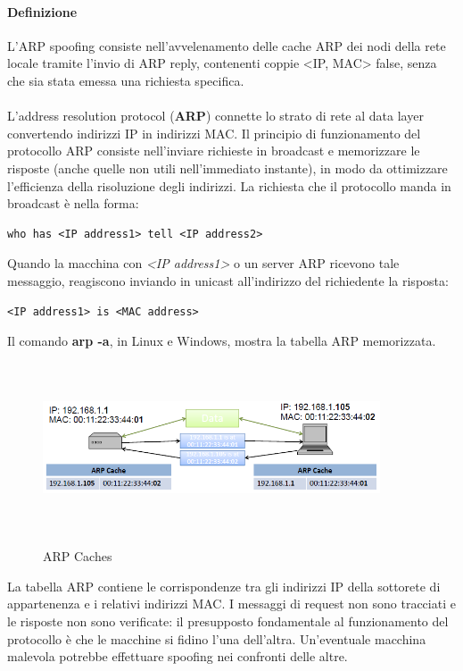 \paragraph{Definizione}
L'ARP spoofing consiste nell'avvelenamento delle cache ARP dei nodi della rete locale tramite l'invio di ARP reply, contenenti coppie <IP, MAC> false, senza che sia stata emessa una richiesta specifica. \\ \\
L'address resolution protocol (\textbf{ARP}) connette lo strato di rete al data layer convertendo indirizzi IP in indirizzi MAC. Il principio di funzionamento del protocollo ARP consiste nell'inviare richieste in broadcast e memorizzare le risposte (anche quelle non utili nell'immediato instante), in modo da ottimizzare l'efficienza della risoluzione degli indirizzi. La richiesta che il protocollo manda in broadcast è nella forma: 
\begin{lstlisting}
who has <IP address1> tell <IP address2>
\end{lstlisting}
Quando la macchina con \textit{<IP address1>} o un server ARP ricevono tale messaggio, reagiscono inviando in unicast all'indirizzo del richiedente la risposta:
\begin{lstlisting}
<IP address1> is <MAC address>
\end{lstlisting}
Il comando \textbf{arp -a}, in Linux e Windows, mostra la tabella ARP memorizzata. 
\begin{figure}[htbp]
	\centering%
	\subfigure%
	{\includegraphics[height=5cm, width=10cm, keepaspectratio]{Immagini/reti/ARP_Caches.png}}
	\caption{ARP Caches\label{fig:ARP_Caches}} 	
\end{figure}
La tabella ARP contiene le corrispondenze tra gli indirizzi IP della sottorete di appartenenza e i relativi indirizzi MAC. I messaggi di request non sono tracciati e le risposte non sono verificate: il presupposto fondamentale al funzionamento del protocollo è che le macchine si fidino l'una dell'altra. Un'eventuale macchina malevola potrebbe effettuare spoofing nei confronti delle altre.
